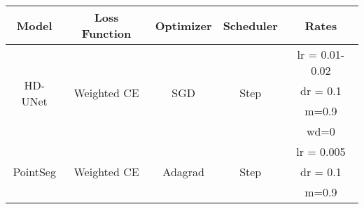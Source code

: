 \documentclass{article}
\begin{document}
\begin{table}[htb]
\begin{adjustbox}{max width=\textwidth}
\begin{tabular}{ccccc}
\hline
\multicolumn{1}{|c|}{Model}                       & \multicolumn{1}{c|}{Loss Function}                                 & \multicolumn{1}{c|}{Optimizer}                & \multicolumn{1}{c|}{Scheduler}             & \multicolumn{1}{c|}{Rates}          \\ \hline
\multicolumn{1}{|c|}{\multirow{4}{*}{HD-UNet \cite{yang2018hdnet}}}    & \multicolumn{1}{c|}{\multirow{4}{*}{Weighted CE}}                  & \multicolumn{1}{c|}{\multirow{4}{*}{SGD}}     & \multicolumn{1}{c|}{\multirow{4}{*}{Step}} & \multicolumn{1}{c|}{lr = 0.01-0.02} \\ \cline{5-5} 
\multicolumn{1}{|c|}{}                            & \multicolumn{1}{c|}{}                                              & \multicolumn{1}{c|}{}                         & \multicolumn{1}{c|}{}                      & \multicolumn{1}{c|}{dr = 0.1}       \\ \cline{5-5} 
\multicolumn{1}{|c|}{}                            & \multicolumn{1}{c|}{}                                              & \multicolumn{1}{c|}{}                         & \multicolumn{1}{c|}{}                      & \multicolumn{1}{c|}{m=0.9}          \\ \cline{5-5} 
\multicolumn{1}{|c|}{}                            & \multicolumn{1}{c|}{}                                              & \multicolumn{1}{c|}{}                         & \multicolumn{1}{c|}{}                      & \multicolumn{1}{c|}{wd=0}           \\ \hline
\multicolumn{1}{|c|}{\multirow{4}{*}{PointSeg \cite{wang2018pointseg}}}   & \multicolumn{1}{c|}{\multirow{4}{*}{Weighted CE}}                  & \multicolumn{1}{c|}{\multirow{4}{*}{Adagrad}} & \multicolumn{1}{c|}{\multirow{4}{*}{Step}} & \multicolumn{1}{c|}{lr = 0.005}     \\ \cline{5-5} 
\multicolumn{1}{|c|}{}                            & \multicolumn{1}{c|}{}                                              & \multicolumn{1}{c|}{}                         & \multicolumn{1}{c|}{}                      & \multicolumn{1}{c|}{dr = 0.1}       \\ \cline{5-5} 
\multicolumn{1}{|c|}{}                            & \multicolumn{1}{c|}{}                                              & \multicolumn{1}{c|}{}                         & \multicolumn{1}{c|}{}                      & \multicolumn{1}{c|}{m=0.9}          \\ \cline{5-5} 

\end{tabular}
\end{adjustbox}
\end{table}
\end{document}

